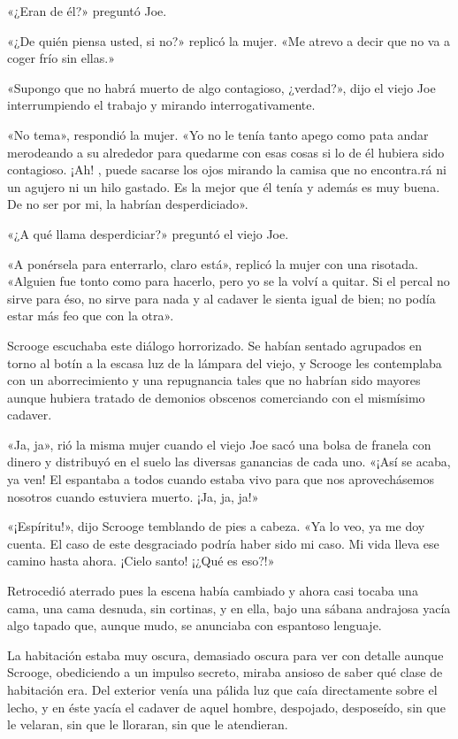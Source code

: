 \documentclass{novela}
\begin{document}
 «¿Eran de él?» preguntó Joe.

 «¿De quién piensa usted, si no?» replicó la mujer. «Me atrevo a decir que no va a coger frío sin ellas.»

 «Supongo que no habrá muerto de algo contagioso, ¿verdad?», dijo el viejo Joe interrumpiendo el trabajo y mirando interrogativamente.

 «No tema», respondió la mujer. «Yo no le tenía tanto apego como pata andar merodeando a su alrededor para quedarme con esas cosas si lo de él hubiera sido contagioso. ¡Ah! , puede sacarse los ojos mirando la camisa que no encontra.rá ni un agujero ni un hilo gastado. Es la mejor que él tenía y además es muy buena. De no ser por mi, la habrían desperdiciado».

 «¿A qué llama desperdiciar?» preguntó el viejo Joe.

 «A ponérsela para enterrarlo, claro está», replicó la mujer con una risotada. «Alguien fue tonto como para hacerlo, pero yo se la volví a quitar. Si el percal no sirve para éso, no sirve para nada y al cadaver le sienta igual de bien; no podía estar más feo que con la otra».

 Scrooge escuchaba este diálogo horrorizado. Se habían sentado agrupados en torno al botín a la escasa luz de la lámpara del viejo, y Scrooge les contemplaba con un aborrecimiento y una repugnancia tales que no habrían sido mayores aunque hubiera tratado de demonios obscenos comerciando con el mismísimo cadaver.

 «Ja, ja», rió la misma mujer cuando el viejo Joe sacó una bolsa de franela con dinero y distribuyó en el suelo las diversas ganancias de cada uno. «¡Así se acaba, ya ven! El espantaba a todos cuando estaba vivo para que nos aprovechásemos nosotros cuando estuviera muerto. ¡Ja, ja, ja!»

 «¡Espíritu!», dijo Scrooge temblando de pies a cabeza. «Ya lo veo, ya me doy cuenta. El caso de este desgraciado podría haber sido mi caso. Mi vida lleva ese camino hasta ahora. ¡Cielo santo! ¡¿Qué es eso?!»

 Retrocedió aterrado pues la escena había cambiado y ahora casi tocaba una cama, una cama desnuda, sin cortinas, y en ella, bajo una sábana andrajosa yacía algo tapado que, aunque mudo, se anunciaba con espantoso lenguaje.

 La habitación estaba muy oscura, demasiado oscura para ver con detalle aunque Scrooge, obediciendo a un impulso secreto, miraba ansioso de saber qué clase de habitación era. Del exterior venía una pálida luz que caía directamente sobre el lecho, y en éste yacía el cadaver de aquel hombre, despojado, desposeído, sin que le velaran, sin que le lloraran, sin que le atendieran.
\end{document}
